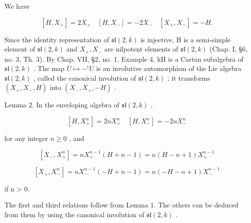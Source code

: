 We have

\[
[ H, X _ {+} ] = 2 X _ {+} \quad [ H, X _ {-} ] = - 2 X _ {-} \quad [ X _ {+}, X _ {-} ] = - H.\tag{1}
\]

Since the identity representation of \(\mathfrak{sl}(2,k)\) is injective, H is a semi-simple element of \(\mathfrak{sl}(2,k)\) and \(X_{+}, X_{-}\) are nilpotent elements of \(\mathfrak{sl}(2,k)\) (Chap. I, §6, no. 3, Th. 3). By Chap. VII, §2, no. 1, Example 4, kH is a Cartan subalgebra of \(\mathfrak{sl}(2,k)\) . The map \(U \mapsto -^{t}U\) is an involutive automorphism of the Lie algebra \(\mathfrak{sl}(2,k)\) , called the canonical involution of \(\mathfrak{sl}(2,k)\) ; it transforms \((X_{+}, X_{-}, H)\) into \((X_{-}, X_{+}, -H)\) .

Lemma 2. In the enveloping algebra of \(\mathfrak{sl}(2,k)\) ,

\[
[ H, X _ {+} ^ {n} ] = 2 n X _ {+} ^ {n} \quad [ H, X _ {-} ^ {n} ] = - 2 n X _ {-} ^ {n}
\]

for any integer \(n \geq 0\) , and

\[
[ X _ {-}, X _ {+} ^ {n} ] = n X _ {+} ^ {n - 1} (H + n - 1) = n (H - n + 1) X _ {+} ^ {n - 1}
\]

\[
[ X _ {+}, X _ {-} ^ {n} ] = n X _ {-} ^ {n - 1} (- H + n - 1) = n (- H - n + 1) X _ {-} ^ {n - 1}
\]

if n \textgreater{} 0.

The first and third relations follow from Lemma 1. The others can be deduced from them by using the canonical involution of \(\mathfrak{sl}(2,k)\) .

